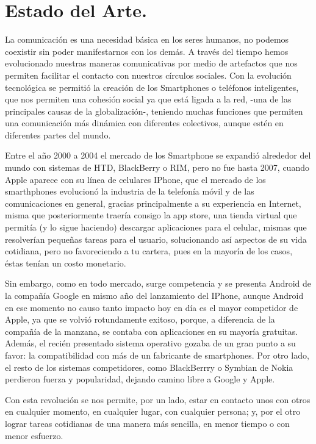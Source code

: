 \section{Estado del Arte.}

\noindent
La comunicación es una necesidad básica en los seres humanos, no podemos coexistir sin poder manifestarnos con los demás. A través del tiempo hemos evolucionado nuestras maneras comunicativas por medio de artefactos que nos permiten facilitar el contacto con nuestros círculos sociales. Con la evolución tecnológica se permitió la creación de los Smartphones o teléfonos inteligentes, que nos permiten una cohesión social ya que está ligada a la red, -una de las principales causas de la globalización-, teniendo muchas funciones que permiten una comunicación más dinámica con diferentes colectivos, aunque estén en diferentes partes del mundo.

\noindent
\newline
Entre el año 2000 a 2004 el mercado de los Smartphone se expandió alrededor del mundo con sistemas de HTD, BlackBerry o RIM, pero no fue hasta 2007, cuando Apple aparece con su línea de celulares IPhone, que el mercado de los smarthphones evolucionó la industria de la telefonía móvil y de las comunicaciones en general, gracias principalmente a su experiencia en Internet, misma que posteriormente traería consigo la app store, una tienda virtual que permitía (y lo sigue haciendo) descargar aplicaciones para el celular, mismas que resolverían pequeñas tareas para el usuario, solucionando así aspectos de su vida cotidiana, pero no favoreciendo a tu cartera, pues en la mayoría de los casos, éstas tenían un costo monetario. 

\noindent
Sin embargo, como en todo mercado, surge competencia y se presenta Android de la compañía Google en mismo año del lanzamiento del IPhone, aunque Android en ese momento no causo tanto impacto hoy en día es el mayor competidor de Apple, ya que se volvió rotundamente exitoso, porque, a diferencia de la compañía de la manzana, se contaba con aplicaciones en su mayoría gratuitas. Además, el recién presentado sistema operativo gozaba de un gran punto a su favor: la compatibilidad con más de un fabricante de smartphones. 
Por otro lado, el resto de los sistemas competidores, como BlackBerrry o Symbian de Nokia perdieron fuerza y popularidad, dejando camino libre a Google y Apple.

\noindent
\newline
Con esta revolución se nos permite, por un lado, estar en contacto unos con otros en cualquier momento, en cualquier lugar, con cualquier persona; y, por el otro lograr tareas cotidianas de una manera más sencilla, en menor tiempo o con menor esfuerzo. \cite{Conexion}

